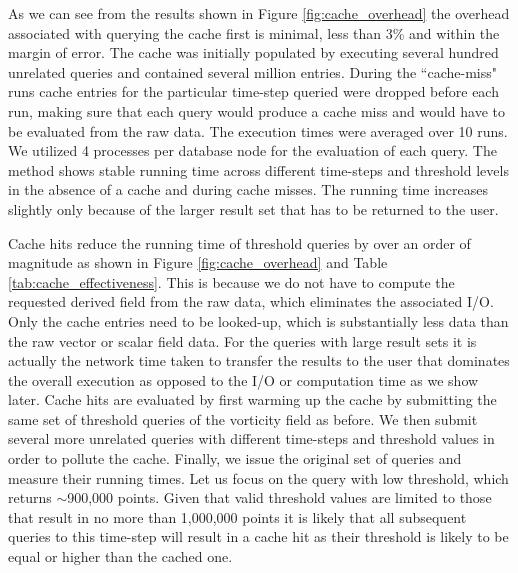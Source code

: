 \documentclass{sig-alternate}
\begin{document}
As we can see from the results shown in Figure \ref{fig:cache_overhead} the overhead associated with querying the cache first is minimal, 
less than 3\% and within the margin of error.
The cache was initially populated by executing several hundred unrelated queries and contained several million entries.
During the ``cache-miss" runs cache entries for the particular time-step queried were dropped before each run, making sure that each query would
produce a cache miss and would have to be evaluated from the raw data. 
The execution times were averaged over 10 runs.
We utilized 4 processes per database node for the evaluation of each query. 
The method shows stable running time across different time-steps and threshold levels in the absence of a cache and during cache misses.
The running time increases slightly only because of the larger result set that has to be returned to the user.

Cache hits reduce the running time of threshold queries by over an order of magnitude as shown in Figure \ref{fig:cache_overhead} and
Table \ref{tab:cache_effectiveness}. This is because we do not have to compute the requested derived
field from the raw data, which eliminates the associated I/O. Only the cache entries need to be looked-up, which is substantially less data
than the raw vector or scalar field data. For the queries with large result sets it is actually the network time taken to transfer the results to the user that 
dominates the overall execution as opposed to the I/O or computation time as we show later.
Cache hits are evaluated by first warming up the cache by submitting the same set of threshold queries of the vorticity field as before. We then submit
several more unrelated queries with different time-steps and threshold values in order to pollute the cache. Finally, we issue the original set of queries and 
measure their running times. Let us focus on the query
with low threshold, which returns $\sim$900,000 points. Given that valid threshold values are limited to those that result in no more than 1,000,000 points
it is likely that all subsequent queries to this time-step will result in a cache hit as their threshold is likely to be equal or higher than the cached one.
\end{document}
